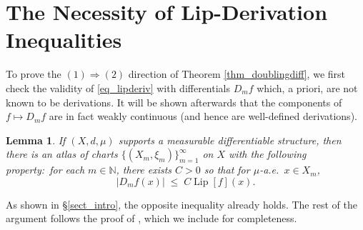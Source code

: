 \documentclass[reqno]{amsart}
\theoremstyle{plain}
\newtheorem{lemma}[thm]{Lemma}
\theoremstyle{definition}
\theoremstyle{remark}
\numberwithin{equation}{section}
\newcommand{\Lip}{\operatorname{Lip}}
\newcommand{\N}{\mathbb{N}}
\begin{document}
\section{The Necessity of Lip-Derivation Inequalities} \label{sect_suff}

To prove the $(1) \Rightarrow (2)$ direction of Theorem \ref{thm_doublingdiff}, we first check the validity of \eqref{eq_lipderiv} with differentials $D_mf$ which, a priori, are not known to be derivations.  It will be shown afterwards that the components of $f \mapsto D_mf$ are in fact weakly continuous (and hence are well-defined derivations).

\begin{lemma} \label{lemma_lipdiff}
If $(X,d,\mu)$ supports a measurable differentiable structure, then there is an atlas of charts $\{ (X_m,\xi_m) \}_{m=1}^\infty$ on $X$ with the following property:\ for each $m \in \N$, there exists $C > 0$ so that  for $\mu$-a.e.\ $x \in X_m$,
$$
|D_mf(x)| \;\leq\; C \Lip[f](x).
$$
\end{lemma}

As shown in \S\ref{sect_intro}, the opposite inequality already holds. %
The rest of the argument follows the proof of \cite[Thm 4.38(ii)]{Cheeger}, which we include for completeness.  
\end{document}
